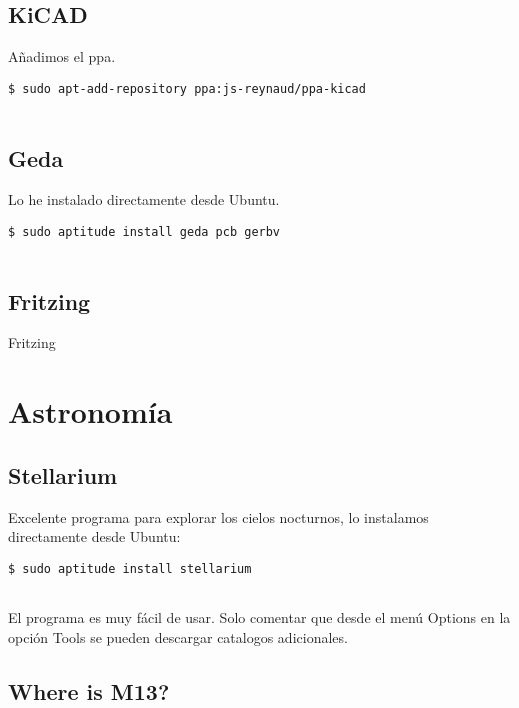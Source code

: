 \subsection{KiCAD}\label{kicad}

Añadimos el ppa.

\begin{verbatim}
$ sudo apt-add-repository ppa:js-reynaud/ppa-kicad
      
\end{verbatim}

\subsection{Geda}\label{geda}

Lo he instalado directamente desde Ubuntu.

\begin{verbatim}
$ sudo aptitude install geda pcb gerbv
      
\end{verbatim}

\subsection{Fritzing}\label{fritzing}

Fritzing

\section{Astronomía}\label{astronomuxeda}

\subsection{Stellarium}\label{stellarium}

Excelente programa para explorar los cielos nocturnos, lo instalamos
directamente desde Ubuntu:

\begin{verbatim}
$ sudo aptitude install stellarium
      
\end{verbatim}

El programa es muy fácil de usar. Solo comentar que desde el menú
Options en la opción Tools se pueden descargar catalogos adicionales.

\subsection{Where is M13?}\label{where-is-m13}


